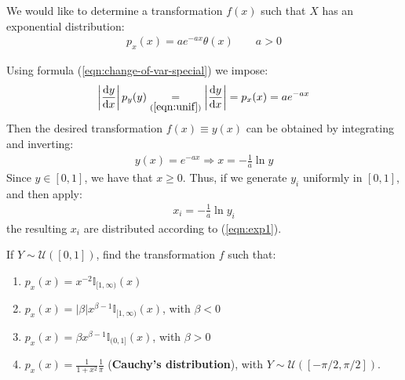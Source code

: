 \documentclass[../template.tex]{subfiles}
\begin{document}
We would like to determine a transformation $f(x)$ such that $X$ has an exponential distribution:
\begin{align}\label{eqn:exp1}
    p_x(x) = a e^{-a x} \theta(x) \qquad a > 0
\end{align} 

Using formula (\ref{eqn:change-of-var-special}) we impose:
\begin{align*}
    \left| \dv{y}{x} \right| p_y(y) \underset{(\ref{eqn:unif})}{=} \left|\dv{y}{x} \right| = p_x(x) = a e^{-ax}
\end{align*}
Then the desired transformation $f(x) \equiv y(x)$ can be obtained by integrating and inverting:
\begin{align*}
    y(x) = e^{-ax} \Rightarrow x=-\frac{1}{a} \ln y 
\end{align*}
Since $y \in [0,1]$, we have that $x \geq 0$. Thus, if we generate $y_i$ uniformly in $[0,1]$, and then apply:
\begin{align*}
    x_i = -\frac{1}{a}  \ln y_i
\end{align*}
the resulting $x_i$ are distributed according to (\ref{eqn:exp1}).

\begin{exo}
    If $Y \sim \mathcal{U}([0,1])$, find the transformation $f$ such that:
    \begin{enumerate}[label=\alph*.]
        \item $p_x(x) = x^{-2} \mathbb{I}_{[1,\infty)}(x)$
        \item $p_x(x) = |\beta| x^{\beta-1} \mathbb{I}_{[1, \infty)}(x)$, with $\beta < 0$
        \item $p_x(x) = \beta x^{\beta-1} \mathbb{I}_{(0,1]}(x)$, with $\beta > 0$
        \item $\displaystyle p_x(x) = \frac{1}{1+x^2} \frac{1}{\pi}$ (\textbf{Cauchy's distribution}), with $Y \sim \mathcal{U}([-\pi/2, \pi/2])$.  
    \end{enumerate}
    
\end{exo}
\end{document}
